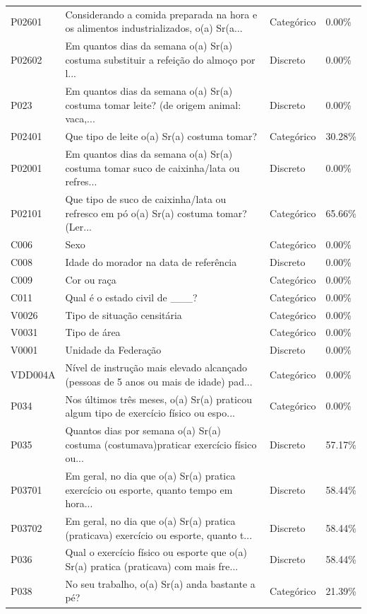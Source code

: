 \documentclass[12pt, a4paper]{article}
\begin{document}
\begin{longtable}{p{2.5cm} p{7.5cm} p{2.5cm} p{2.5cm}}
P02601 & Considerando a comida preparada na hora e os alimentos industrializados, o(a) Sr(a... & Categórico & 0.00\% \\
P02602 & Em quantos dias da semana o(a) Sr(a) costuma substituir a refeição do almoço por l... & Discreto & 0.00\% \\
P023 & Em quantos dias da semana o(a) Sr(a) costuma tomar leite? (de origem animal: vaca,... & Discreto & 0.00\% \\
P02401 & Que tipo de leite o(a) Sr(a) costuma tomar? & Categórico & 30.28\% \\
P02001 & Em quantos dias da semana o(a) Sr(a) costuma tomar suco de caixinha/lata ou refres... & Discreto & 0.00\% \\
P02101 & Que tipo de suco de caixinha/lata ou refresco em pó o(a) Sr(a) costuma tomar? (Ler... & Categórico & 65.66\% \\
C006 & Sexo & Categórico & 0.00\% \\
C008 & Idade do morador na data de referência & Discreto & 0.00\% \\
C009 & Cor ou raça & Categórico & 0.00\% \\
C011 & Qual é o estado civil de \_\_\_? & Categórico & 0.00\% \\
V0026 & Tipo de situação censitária & Categórico & 0.00\% \\
V0031 & Tipo de área & Categórico & 0.00\% \\
V0001 & Unidade da Federação & Discreto & 0.00\% \\
VDD004A & Nível de instrução mais elevado alcançado (pessoas de 5 anos ou mais de idade) pad... & Categórico & 0.00\% \\
P034 & Nos últimos três meses, o(a) Sr(a) praticou algum tipo de exercício físico ou espo... & Categórico & 0.00\% \\
P035 & Quantos dias por semana o(a) Sr(a) costuma (costumava)praticar exercício físico ou... & Discreto & 57.17\% \\
P03701 & Em geral, no dia que o(a) Sr(a) pratica exercício ou esporte, quanto tempo em hora... & Discreto & 58.44\% \\
P03702 & Em geral, no dia que o(a) Sr(a) pratica (praticava) exercício ou esporte, quanto t... & Discreto & 58.44\% \\
P036 & Qual o exercício físico ou esporte que o(a) Sr(a) pratica (praticava) com mais fre... & Discreto & 58.44\% \\
P038 & No seu trabalho, o(a) Sr(a) anda bastante a pé? & Categórico & 21.39\% \\

\end{longtable}
\end{document}
